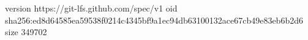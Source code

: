 version https://git-lfs.github.com/spec/v1
oid sha256:ed8d64585ea59538f0214c4345bf9a1ec94db63100132ace67cb49e83eb6b2d6
size 349702
